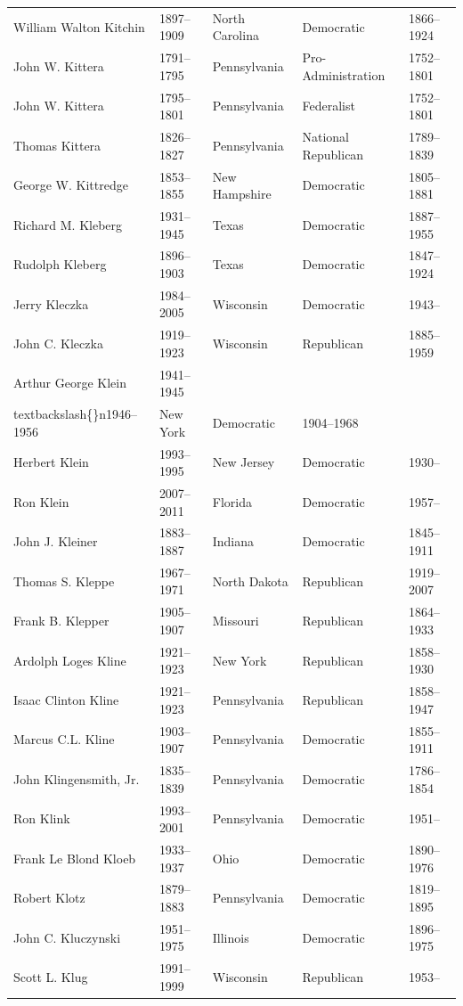 \documentclass{article}
\begin{document}
\begin{tabular}{lllll}
William Walton Kitchin & 1897–1909 & North Carolina & Democratic & 1866–1924 \\
John W. Kittera & 1791–1795 & Pennsylvania & Pro-Administration & 1752–1801 \\
John W. Kittera & 1795–1801 & Pennsylvania & Federalist & 1752–1801 \\
Thomas Kittera & 1826–1827 & Pennsylvania & National Republican & 1789–1839 \\
George W. Kittredge & 1853–1855 & New Hampshire & Democratic & 1805–1881 \\
Richard M. Kleberg & 1931–1945 & Texas & Democratic & 1887–1955 \\
Rudolph Kleberg & 1896–1903 & Texas & Democratic & 1847–1924 \\
Jerry Kleczka & 1984–2005 & Wisconsin & Democratic & 1943– \\
John C. Kleczka & 1919–1923 & Wisconsin & Republican & 1885–1959 \\
Arthur George Klein & 1941–1945\\textbackslash\{\}n1946–1956 & New York & Democratic & 1904–1968 \\
Herbert Klein & 1993–1995 & New Jersey & Democratic & 1930– \\
Ron Klein & 2007–2011 & Florida & Democratic & 1957– \\
John J. Kleiner & 1883–1887 & Indiana & Democratic & 1845–1911 \\
Thomas S. Kleppe & 1967–1971 & North Dakota & Republican & 1919–2007 \\
Frank B. Klepper & 1905–1907 & Missouri & Republican & 1864–1933 \\
Ardolph Loges Kline & 1921–1923 & New York & Republican & 1858–1930 \\
Isaac Clinton Kline & 1921–1923 & Pennsylvania & Republican & 1858–1947 \\
Marcus C.L. Kline & 1903–1907 & Pennsylvania & Democratic & 1855–1911 \\
John Klingensmith, Jr. & 1835–1839 & Pennsylvania & Democratic & 1786–1854 \\
Ron Klink & 1993–2001 & Pennsylvania & Democratic & 1951– \\
Frank Le Blond Kloeb & 1933–1937 & Ohio & Democratic & 1890–1976 \\
Robert Klotz & 1879–1883 & Pennsylvania & Democratic & 1819–1895 \\
John C. Kluczynski & 1951–1975 & Illinois & Democratic & 1896–1975 \\
Scott L. Klug & 1991–1999 & Wisconsin & Republican & 1953– \\

\end{tabular}
\end{document}
